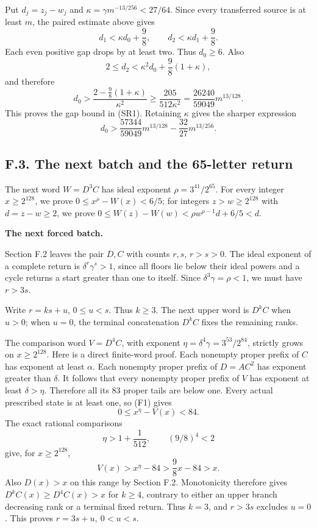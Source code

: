 \documentclass[12pt]{article}
\begin{document}
Put \(d_j=z_j-w_j\) and \(\kappa=\gamma m^{-13/256}<27/64\). Since every
transferred source is at least \(m\), the paired estimate above gives \[
d_1<\kappa d_0+\frac98,\qquad
d_2<\kappa d_1+\frac98.
\tag{F8}
\] Each even positive gap drops by at least two. Thus \(d_0\ge6\). Also
\[
2\le d_2<\kappa^2d_0+\frac98(1+\kappa),
\] and therefore \[
d_0>\frac{2-\frac98(1+\kappa)}{\kappa^2}
 \ge\frac{205}{512\kappa^2}
 =\frac{26240}{59049}m^{13/128}.
\] This proves the gap bound in (SR1). Retaining \(\kappa\) gives the
sharper expression \[
d_0>
\frac{57344}{59049}m^{13/128}
-\frac{32}{27}m^{13/256}.
\]

\subsection{F.3. The next batch and the 65-letter
return}\label{f.3.-the-next-batch-and-the-65-letter-return}

The next word \(W=D^3C\) has ideal exponent \(\rho=3^{41}/2^{65}\). For
every integer \(x\ge2^{128}\), we prove \(0\le x^\rho-W(x)<6/5\); for
integers \(z>w\ge2^{128}\) with \(d=z-w\ge2\), we prove
\(0\le W(z)-W(w)<\rho w^{\rho-1}d+6/5<d\).

\textbf{The next forced batch.}

Section F.2 leaves the pair \(D,C\) with counts \(r,s\), \(r>s>0\). The
ideal exponent of a complete return is \(\delta^r\gamma^s>1\), since all
floors lie below their ideal powers and a cycle returns a start greater
than one to itself. Since \(\delta^3\gamma=\rho<1\), we must have
\(r>3s\).

Write \(r=ks+u\), \(0\le u<s\). Thus \(k\ge3\). The next upper word is
\(D^kC\) when \(u>0\); when \(u=0\), the terminal concatenation \(D^kC\)
fixes the remaining ranks.

The comparison word \(V=D^4C\), with exponent
\(\eta=\delta^4\gamma=3^{53}/2^{84}\), strictly grows on
\(x\ge2^{128}\). Here is a direct finite-word proof. Each nonempty
proper prefix of \(C\) has exponent at least \(\alpha\). Each nonempty
proper prefix of \(D=AC^2\) has exponent greater than \(\delta\). It
follows that every nonempty proper prefix of \(V\) has exponent at least
\(\delta>\eta\). Therefore all its 83 proper tails are below one. Every
actual prescribed state is at least one, so (F1) gives \[
0\le x^\eta-V(x)<84.
\] The exact rational comparisons \[
\eta>1+\frac1{512},\qquad (9/8)^4<2
\] give, for \(x\ge2^{128}\), \[
V(x)>x^\eta-84>\frac98x-84>x.
\] Also \(D(x)>x\) on this range by Section F.2. Monotonicity therefore
gives \(D^kC(x)\ge D^4C(x)>x\) for \(k\ge4\), contrary to either an
upper branch decreasing rank or a terminal fixed return. Thus \(k=3\),
and \(r>3s\) excludes \(u=0\). This proves \(r=3s+u,\ 0<u<s\).
\end{document}
